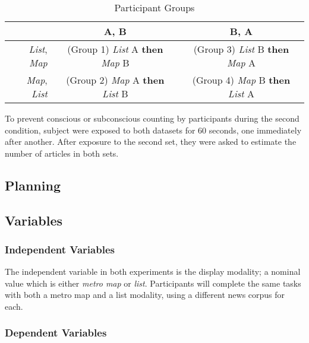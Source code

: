 \begin{table}[htbp!]
\centering
\begin{tabular}{|r|c|c|}
\hline
  & A, B & B, A\\
\hline
\textit{List}, \textit{Map} & (Group 1) \textit{List} A \textbf{then} \textit{Map} B & (Group 3) \textit{List} B \textbf{then} \textit{Map} A \\
\hline
\textit{Map}, \textit{List} & (Group 2) \textit{Map} A \textbf{then} \textit{List} B & (Group 4) \textit{Map} B \textbf{then} \textit{List} A \\
\hline
\end{tabular}
\caption{Participant Groups} \label{tab:experimentalgroups}
\end{table}

To prevent conscious or subconscious counting by participants during the second condition, subject were exposed to both datasets for 60 seconds, one immediately after another. After exposure to the second set, they were asked to estimate the number of articles in both sets.

\subsection{Planning}





\subsection{Variables}

\subsubsection{Independent Variables}

The independent variable in both experiments is the display modality; a nominal value which is either \textit{metro map} or \textit{list}. Participants will complete the same tasks with both a metro map and a list modality, using a different news corpus for each.

\subsubsection{Dependent Variables}

